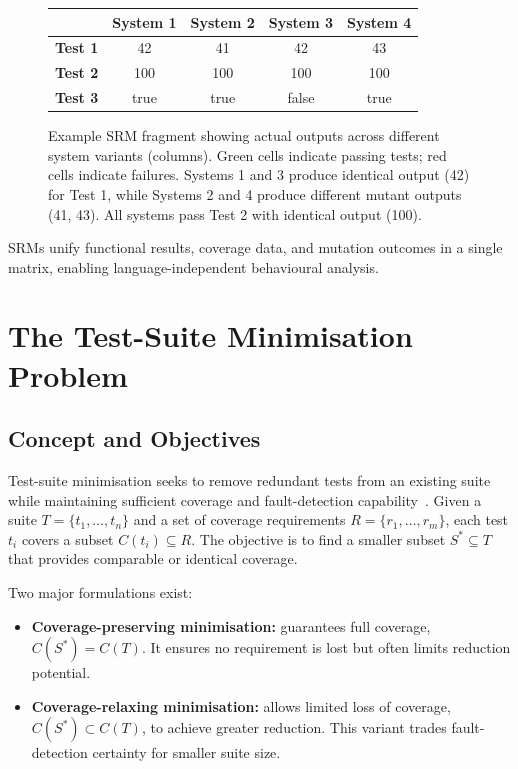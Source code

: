 \begin{figure}[H]
  \centering
  \begin{tabular}{c|cccc}
    & \textbf{System 1} & \textbf{System 2} & \textbf{System 3} & \textbf{System 4} \\
    \hline
    \textbf{Test 1} & \cellcolor{green!20}42 & \cellcolor{red!20}41 & \cellcolor{green!20}42 & \cellcolor{red!20}43 \\
    \textbf{Test 2} & \cellcolor{green!20}100 & \cellcolor{green!20}100 & \cellcolor{green!20}100 & \cellcolor{green!20}100 \\
    \textbf{Test 3} & \cellcolor{green!20}true & \cellcolor{green!20}true & \cellcolor{red!20}false & \cellcolor{green!20}true \\
  \end{tabular}
  \caption{Example SRM fragment showing actual outputs across different system variants (columns). Green cells indicate passing tests; red cells indicate failures. Systems 1 and 3 produce identical output (42) for Test 1, while Systems 2 and 4 produce different mutant outputs (41, 43). All systems pass Test 2 with identical output (100).}
  \label{fig:srm-mutation-example}
\end{figure}

SRMs unify functional results, coverage data, and mutation outcomes in a single matrix, enabling language-independent behavioural analysis.

\section{The Test-Suite Minimisation Problem}

\subsection{Concept and Objectives}

Test-suite minimisation seeks to remove redundant tests from an existing suite while maintaining sufficient coverage and fault-detection capability~\cite{yoo2012}.  
Given a suite \(T = \{t_1, \ldots, t_n\}\) and a set of coverage requirements \(R = \{r_1, \ldots, r_m\}\), each test \(t_i\) covers a subset \(C(t_i) \subseteq R\).  
The objective is to find a smaller subset \(S^* \subseteq T\) that provides comparable or identical coverage.

Two major formulations exist:

\begin{itemize}
  \item \textbf{Coverage-preserving minimisation:}  
  guarantees full coverage, \(C(S^*) = C(T)\).  
  It ensures no requirement is lost but often limits reduction potential.
  \item \textbf{Coverage-relaxing minimisation:}  
  allows limited loss of coverage, \(C(S^*) \subset C(T)\), to achieve greater reduction.  
  This variant trades fault-detection certainty for smaller suite size.
\end{itemize}

